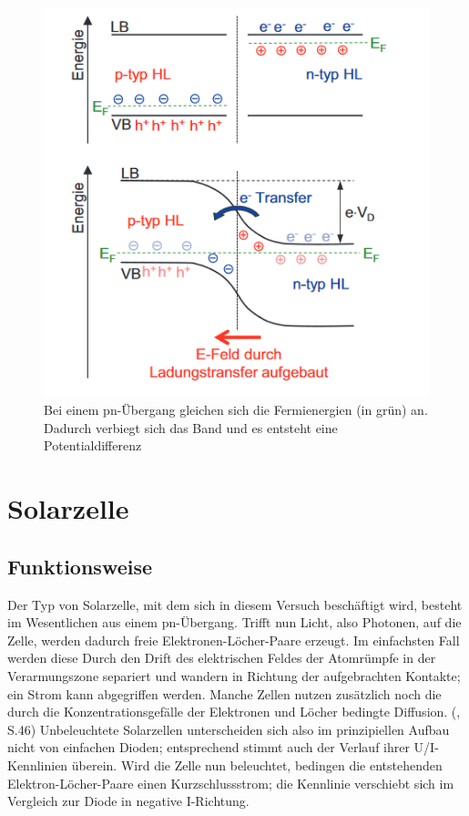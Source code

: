 \begin{figure}[h]
    \centering
    \includegraphics[scale=0.5]{Bilder/Bandverbiegung.png}
    \caption{Bei einem pn-Übergang gleichen sich die Fermienergien (in grün) an. Dadurch verbiegt sich das Band und es entsteht eine 
    Potentialdifferenz \protect \footnotemark}
\end{figure}


\section{Solarzelle}
\subsection{Funktionsweise}
Der Typ von Solarzelle, mit dem sich in diesem Versuch beschäftigt wird, besteht im Wesentlichen aus einem pn-Übergang. 
Trifft nun Licht, also Photonen, auf die Zelle, werden dadurch freie Elektronen-Löcher-Paare erzeugt. Im einfachsten Fall werden diese 
Durch den Drift des elektrischen Feldes der Atomrümpfe in der Verarmungszone separiert und wandern in Richtung der aufgebrachten 
Kontakte; ein Strom kann abgegriffen werden. Manche Zellen nutzen zusätzlich noch die durch die Konzentrationsgefälle der Elektronen 
und Löcher bedingte Diffusion. (\cite{Shah2020}, S.46) Unbeleuchtete Solarzellen unterscheiden sich also im 
prinzipiellen Aufbau nicht von einfachen Dioden; entsprechend stimmt auch der Verlauf ihrer U/I-Kennlinien überein. Wird die Zelle nun 
beleuchtet, bedingen die entstehenden Elektron-Löcher-Paare einen Kurzschlussstrom; die Kennlinie verschiebt sich im Vergleich zur 
Diode in negative I-Richtung. \\

